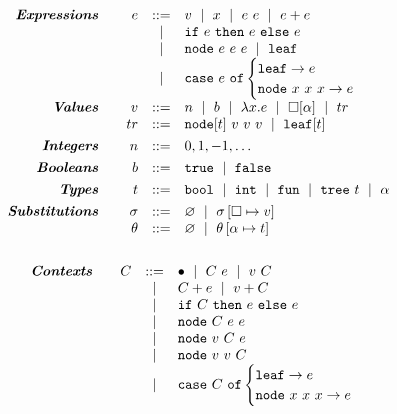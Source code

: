 \begin{figure}
$$
\begin{array}{rrcl}

\emphbf{Expressions} \quad
  & e & ::=    & v \spmid x \spmid \eapp{e}{e} \spmid \eplus{e}{e}\\
  &   & \spmid & \eif{e}{e}{e} \\
  &   & \spmid & \enode{e}{e}{e} \spmid \eleaf \\
  &   & \spmid & \ecase{e}{e}{x}{x}{x}{e} \\[0.1in]

\emphbf{Values} \quad
  & v  & ::= & n \spmid b \spmid \efun{x}{e} \spmid \vhole{\thole} \spmid tr \\
  & tr & ::= & \vnode{t}{v}{v}{v} \spmid \vleaf{t} \\[0.05in]

\emphbf{Integers} \quad
  & n & ::= &  0,1,-1,\ldots \\[0.05in]

\emphbf{Booleans} \quad
  & b & ::= &  \etrue \spmid \efalse \\[0.05in]

\emphbf{Types} \quad
  & t & ::= & \tbool \spmid \tint \spmid \tfun \spmid \ttree{t} \spmid \thole \\[0.05in]

\emphbf{Substitutions} \quad
  & \vsu & ::= & \emptysu \spmid \extendsu{\vsu}{\ehole}{v} \\
  & \tsu & ::= & \emptysu \spmid \extendsu{\tsu}{\thole}{t} \\[0.1in]
\end{array}
$$

$$
\begin{array}{rrcl}
\textbf{\emph{Contexts}} \quad
  & C
  & ::=
  &   	 \bullet
  \ \mid \  C\ e
  \ \mid \  v\ C \\
  & & \ \mid \  & C + e \ \mid \  v + C \\
  & & \ \mid \  & \mathtt{if}\ C\ \mathtt{then}\ e\ \mathtt{else}\ e \\
  & & \ \mid \  & \mathtt{node}\ C\ e\ e \\
  & & \ \mid \  & \mathtt{node}\ v\ C\ e \\
  & & \ \mid \  & \mathtt{node}\ v\ v\ C \\
  & & \ \mid \  & \mathtt{case}\ C\ \mathtt{of} \begin{cases} \mathtt{leaf} \to e\\ \mathtt{node}\ x\ x\ x \to e \end{cases}
  \\[0.05in]
\end{array}
$$


\end{figure}
